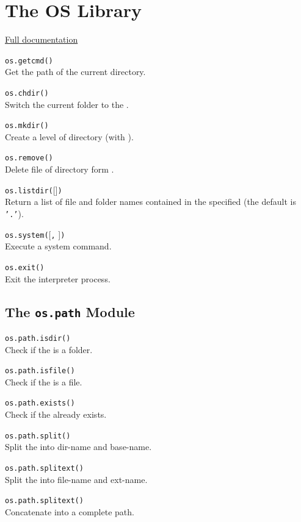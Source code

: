 \newpage
\section*{The OS Library}

\hangpar \href{https://berry.readthedocs.io/en/latest/source/en/Chapter-7.html\#module-os}{Full documentation}

\hangpar \texttt{os.getcmd()} \\
Get the path of the current directory.

\hangpar \texttt{os.chdir(}\texttt{)} \\
Switch the current folder to the .

\hangpar \texttt{os.mkdir(}\texttt{)} \\
Create a level of directory (with ).

\hangpar \texttt{os.remove(}\texttt{)} \\
Delete file of directory form .

\hangpar \texttt{os.listdir(}[]\texttt{)} \\
Return a list of file and folder names contained in the specified  (the default is \texttt{'.'}).

\hangpar \texttt{os.system(}[\texttt{,} ]\texttt{)} \\
Execute a system command.

\hangpar \texttt{os.exit()}\\
Exit the interpreter process.

\subsection*{The \texttt{os.path} Module}

\hangpar \texttt{os.path.isdir(}\texttt{)} \\
Check if the  is a folder.

\hangpar \texttt{os.path.isfile(}\texttt{)} \\
Check if the  is a file.

\hangpar \texttt{os.path.exists(}\texttt{)} \\
Check if the  already exists.

\hangpar \texttt{os.path.split(}\texttt{)} \\
Split the  into dir-name and base-name.

\hangpar \texttt{os.path.splitext(}\texttt{)} \\
Split the  into file-name and ext-name.

\hangpar \texttt{os.path.splitext(}\texttt{)} \\
Concatenate  into a complete path.
